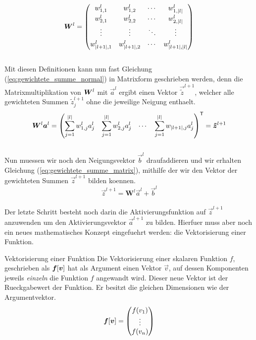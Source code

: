 \begin{equation*}
  \bm{W}^l =
  \begin{pmatrix}
    w_{1,1}^l & w_{1,2}^l & \cdots & w_{1,|l|}^l \\[0.3em]
    w_{2,1}^l & w_{2,2}^l & \cdots & w_{2,|l|}^l \\[0.3em]
    \vdots & \vdots & \ddots & \vdots \\[0.3em]
    w_{|l+1|,1}^l & w_{|l+1|,2}^l & \cdots & w_{|l+1|,|l|}^l
  \end{pmatrix}
\end{equation*}
\\
Mit diesen Definitionen kann nun fast Gleichung (\ref{eq:gewichtete_summe_normal}) in
Matrixform geschrieben werden, denn die Matrixmultiplikation von $\bm{W}^l$ mit
$\vec{a}^{l}$ ergibt einen Vektor $\vec{\tilde{z}}^{l+1}$, welcher alle gewichteten
Summen $\tilde{z}_j^{l+1}$ ohne die jeweilige Neigung enthaelt.
\\
\begin{equation*}
  \bm{W}^l \bm{a}^{l} = \begin{pmatrix}\displaystyle \sum_{j=1}^{|l|} w_{1,j}^l a_j^l &\displaystyle \sum_{j=1}^{|l|} w_{2,j}^l a_j^l & \cdots &\displaystyle \sum_{j=1}^{|l|} w_{|l+1|,j} a_j^l \end{pmatrix}^{\mathsf{T}} = \bm{\tilde{z}}^{l+1}
\end{equation*}
\\
Nun muessen wir noch den Neigungsvektor $\vec{b}^l$ draufaddieren und wir
erhalten Gleichung (\ref{eq:gewichtete_summe_matrix}), mithilfe der wir den
Vektor der gewichteten Summen $\vec{z}^{l+1}$ bilden koennen.
\\
\begin{equation}\tag{FP1a}\label{eq:gewichtete_summe_matrix}
  \vec{z}^{l+1} = \mathbf{W}^{l} \vec{a}^{l} + \vec{b}^{l}
\end{equation}
\\
Der letzte Schritt besteht noch darin die Aktivierungsfunktion auf $\vec{z}^{l+1}$
anzuwenden um den Aktivierungsvektor $\vec{a}^{l+1}$ zu bilden.
Hierfuer muss aber noch ein neues mathematisches
Konzept eingefuehrt werden: die Vektorisierung einer Funktion.
\para{}

\begin{defbox}{Vektorisierung einer Funktion}
  Die Vektorisierung einer skalaren Funktion $f$, geschrieben als
  $\bm{f}[\bm{v}]$ hat als Argument einen Vektor $\vec{v}$, auf dessen
  Komponenten jeweils \textit{einzeln} die Funktion $f$ angewandt wird. Dieser neue
  Vektor ist der Rueckgabewert der Funktion. Er besitzt die gleichen Dimensionen
  wie der Argumentvektor.
  \\
  \begin{equation*}
    \bm{f}[\bm{v}]=
    \begin{pmatrix}
      f(v_1)\\
      \vdots \\
      f(v_n)\\
    \end{pmatrix}
  \end{equation*}
\end{defbox}

